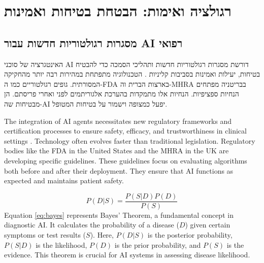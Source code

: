 \documentclass[12pt,a4paper]{article}
\newenvironment{hebrewblock}{%
  \begin{tcolorbox}[enhanced,breakable,title={\hebrewfont עברית},
    colback=blue!3!white,colframe=blue!35!white,fonttitle=\bfseries,
    attach boxed title to top right={yshift=-2.5mm,xshift=-4mm},
    boxed title style={colback=blue!35!white,sharp corners}]
  \begin{hebrew}
}{%
  \end{hebrew}\end{tcolorbox}\medskip
}
\newenvironment{englishblock}{%
  \begin{tcolorbox}[enhanced,breakable,title={English Translation},
    colback=gray!4!white,colframe=gray!40!white,fonttitle=\bfseries]
}{%
  \end{tcolorbox}\medskip
}
\begin{document}
\section{\texthebrew{רגולציה ואימות: הבטחת בטיחות ואמינות}}
\label{sec:regulation}

\subsection{\texthebrew{מסגרות רגולטוריות חדשות עבור AI רפואי}}
\begin{hebrewblock}
האינטגרציה של סוכני AI דורשת מסגרות רגולטוריות חדשות ותהליכי הסמכה כדי להבטיח בטיחות, יעילות ואמינות בסביבות קליניות \cite{fda_ai_ml_samd}. הטכנולוגיה מתפתחת במהירות רבה יותר מהחקיקה המסורתית. גופים רגולטוריים כמו ה-FDA בארצות הברית וה-MHRA בבריטניה מפתחים הנחיות ספציפיות. הנחיות אלו מתמקדות בהערכת אלגוריתמים לפני ואחרי פריסתם. הן מבטיחות שה-AI יפעל כמצופה וישמור על בטיחות המטופל.
\end{hebrewblock}
\begin{englishblock}
The integration of AI agents necessitates new regulatory frameworks and certification processes to ensure safety, efficacy, and trustworthiness in clinical settings \cite{fda_ai_ml_samd}. Technology often evolves faster than traditional legislation. Regulatory bodies like the FDA in the United States and the MHRA in the UK are developing specific guidelines. These guidelines focus on evaluating algorithms both before and after their deployment. They ensure that AI functions as expected and maintains patient safety.
\end{englishblock}

\begin{equation}
P(D|S) = \frac{P(S|D) P(D)}{P(S)}
\label{eq:bayes}
\end{equation}
Equation \eqref{eq:bayes} represents Bayes' Theorem, a fundamental concept in diagnostic AI. It calculates the probability of a disease ($D$) given certain symptoms or test results ($S$). Here, $P(D|S)$ is the posterior probability, $P(S|D)$ is the likelihood, $P(D)$ is the prior probability, and $P(S)$ is the evidence. This theorem is crucial for AI systems in assessing disease likelihood.
\end{document}
